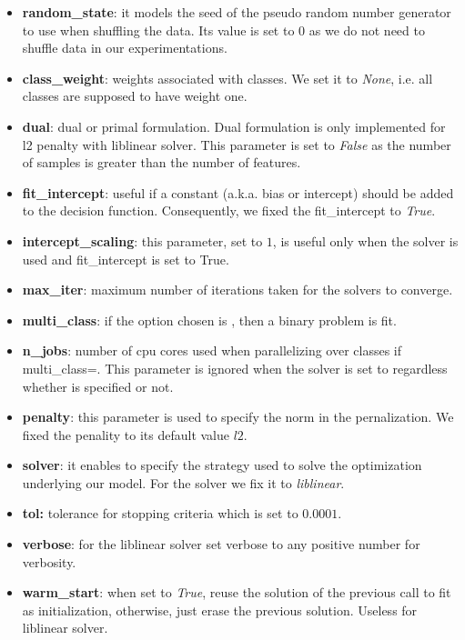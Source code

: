 \begin{itemize}
\item \textbf{random\_state}: it models the seed of the pseudo random number generator to use when shuffling the data. Its value
is set to $0$ as we do not need to shuffle data in our experimentations.
\item \textbf{class\_weight}: weights associated with classes. We set it to \emph{None}, i.e. all classes are supposed to have weight one.
\item \textbf{dual}: dual or primal formulation. Dual formulation is only implemented for l2 penalty with liblinear solver.
This parameter is set to \emph{False} as the number of samples is greater than the number of features.
\item \textbf{fit\_intercept}: useful if a constant (a.k.a. bias or intercept) should be added to the decision function. Consequently,
we fixed the fit\_intercept to \emph{True}.
\item \textbf{intercept\_scaling}: this parameter, set to $1$, is useful only when the solver  is used and fit\_intercept is set to True.
\item \textbf{max\_iter}: maximum number of iterations taken for the solvers to converge.
\item \textbf{multi\_class}: if the option chosen is , then a binary problem is fit.
\item \textbf{n\_jobs}: number of cpu cores used when parallelizing over classes if multi\_class=. This parameter is ignored when the
solver is  set to  regardless whether  is specified or not.
\item \textbf{penalty}: this parameter is used to specify the norm in the pernalization. We fixed the penality to its default value $l2$.
\item \textbf{solver}: it enables to specify the strategy used to solve the optimization underlying our model. For the solver we fix it 
to \emph{liblinear}.
\item \textbf{tol:} tolerance for stopping criteria which is set to $0.0001$.
\item \textbf{verbose}: for the liblinear solver set verbose to any positive number for verbosity.
\item \textbf{warm\_start}: when set to \emph{True}, reuse the solution of the previous call to fit as initialization, otherwise, just erase the
 previous solution. Useless for liblinear solver.
\end{itemize}

